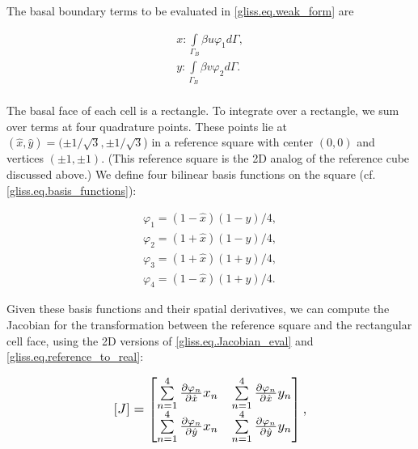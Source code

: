 The basal boundary terms to be evaluated in \eqref{gliss.eq.weak_form} are

\begin{equation}
  \label{gliss.eq.basal_bc}
  \begin{split}
    x: \int\limits_{{\Gamma }_{B}} \beta u{{\varphi }_{1}} d\Gamma , \\
    y: \int\limits_{{\Gamma }_{B}} \beta v{{\varphi }_{2}} d\Gamma . \\
  \end{split}
\end{equation}

\noindent
The basal face of each cell is a rectangle. To integrate over a rectangle, we 
sum over terms at four quadrature points.  These points lie at $(\hat{x},\hat{y}) = (\pm 1/\sqrt{3}, \pm 1/\sqrt{3}$)
in a reference square with center $(0,0)$ and vertices $(\pm1,\pm1)$.
(This reference square is the 2D analog of the reference cube discussed above.)
We define four bilinear basis functions on the square (cf. \eqref{gliss.eq.basis_functions}):

\begin{equation}
  \label{gliss.eq.basis_functions_2d}
  \begin{matrix}
    {{\varphi }_{1}}=(1-\hat{x})(1-\hat{y})/4,  \\[3pt]
    {{\varphi }_{2}}=(1+\hat{x})(1-\hat{y})/4,  \\[3pt]
    {{\varphi }_{3}}=(1+\hat{x})(1+\hat{y})/4,  \\[3pt]
    {{\varphi }_{4}}=(1-\hat{x})(1+\hat{y})/4.
  \end{matrix}
\end{equation}

\noindent
Given these basis functions and their spatial derivatives, we can compute the Jacobian
for the transformation between the reference square and the rectangular cell face,
using the 2D versions of \eqref{gliss.eq.Jacobian_eval} and \eqref{gliss.eq.reference_to_real}:

\begin{equation}
  \label{gliss.eq.Jacobian_eval_2d}
  \scalebox{1.2}{
  $
        [J]=\left[ \begin{matrix}
            \sum\limits_{n=1}^{4}{\frac{\partial {{\varphi }_{n}}}{\partial \hat{x}}{{x}_{n}}} & \sum\limits_{n=1}^{4}{\frac{\partial {{\varphi }_{n}}}{\partial \hat{x}}{{y}_{n}}} \\[6pt]
            \sum\limits_{n=1}^{4}{\frac{\partial {{\varphi }_{n}}}{\partial \hat{y}}{{x}_{n}}} & \sum\limits_{n=1}^{4}{\frac{\partial {{\varphi }_{n}}}{\partial \hat{y}}{{y}_{n}}} \\[6pt]
          \end{matrix} \right],
        $
        }
\end{equation}


